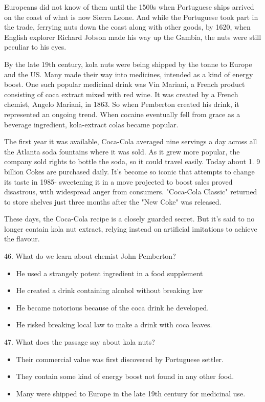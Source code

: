 \documentclass[UTF8,11pt]{ctexart}
\begin{document}
Europeans did not know of them until the 1500s when Portuguese ships arrived on the coast of what is now Sierra Leone. And while the Portuguese took part in the trade, ferrying nuts down the coast along with other goods, by 1620, when English explorer Richard Jobson made his way up the Gambia, the nuts were still peculiar to his eyes.


By the late 19th century, kola nuts were being shipped by the tonne to Europe and the US. Many made their way into medicines, intended as a kind of energy boost. One such popular medicinal drink was Vin Mariani, a French product consisting of coca extract mixed with red wine. It was created by a French chemist, Angelo Mariani, in 1863. So when Pemberton created his drink, it represented an ongoing trend. When cocaine eventually fell from grace as a beverage ingredient, kola-extract colas became popular.


The first year it was available, Coca-Cola averaged nine servings a day across all the Atlanta soda fountains where it was sold. As it grew more popular, the company sold rights to bottle the soda, so it could travel easily. Today about 1. 9 billion Cokes are purchased daily. It's become so iconic that attempts to change its taste in 1985- sweetening it in a move projected to boost sales proved disastrous, with widespread anger from consumers. "Coca-Cola Classic" returned to store shelves just three months after the "New Coke" was released.


These days, the Coca-Cola recipe is a closely guarded secret. But it's said to no longer contain kola nut extract, relying instead on artificial imitations to achieve the flavour.


46. What do we learn about chemist John Pemberton?


\begin{itemize}[leftmargin=2em,itemsep=.2em,topsep=.4em]\item[A.] He used a strangely potent ingredient in a food supplement
\item[B.] He created a drink containing alcohol without breaking law
\item[C.] He became notorious because of the coca drink he developed.
\item[D.] He risked breaking local law to make a drink with coca leaves.
\end{itemize}

47. What does the passage say about kola nuts?


\begin{itemize}[leftmargin=2em,itemsep=.2em,topsep=.4em]\item[A.] Their commercial value was first discovered by Portuguese settler.
\item[B.] They contain some kind of energy boost not found in any other food.
\item[C.] Many were shipped to Europe in the late 19th century for medicinal use.
\end{itemize}
\end{document}
